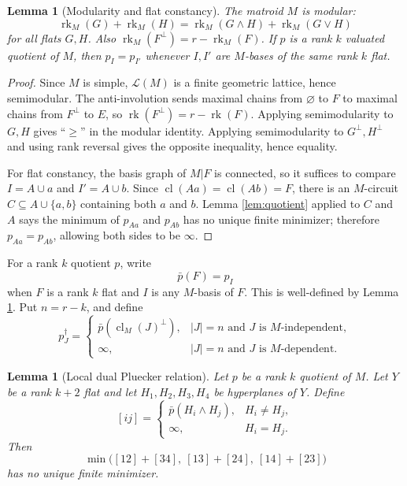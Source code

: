 \documentclass[12pt]{article}
\newtheorem{lemma}[theorem]{Lemma}
\theoremstyle{definition}
\newcommand{\rk}{\operatorname{rk}}
\newcommand{\cl}{\operatorname{cl}}
\newcommand{\cL}{\mathcal L}
\begin{document}
\begin{lemma}[Modularity and flat constancy]\label{lem:modflat}
The matroid \(M\) is modular:
\[
\rk_M(G)+\rk_M(H)=\rk_M(G\wedge H)+\rk_M(G\vee H)
\]
for all flats \(G,H\).  Also \(\rk_M(F^\perp)=r-\rk_M(F)\).  If \(p\) is a rank \(k\) valuated quotient of \(M\), then \(p_I=p_{I'}\) whenever \(I,I'\) are \(M\)-bases of the same rank \(k\) flat.
\end{lemma}

\begin{proof}
Since \(M\) is simple, \(\cL(M)\) is a finite geometric lattice, hence semimodular.  The anti-involution sends maximal chains from \(\varnothing\) to \(F\) to maximal chains from \(F^\perp\) to \(E\), so \(\rk(F^\perp)=r-\rk(F)\).  Applying semimodularity to \(G,H\) gives ``\(\ge\)'' in the modular identity.  Applying semimodularity to \(G^\perp,H^\perp\) and using rank reversal gives the opposite inequality, hence equality.

For flat constancy, the basis graph of \(M|F\) is connected, so it suffices to compare \(I=A\cup a\) and \(I'=A\cup b\).  Since \(\cl(Aa)=\cl(Ab)=F\), there is an \(M\)-circuit \(C\subseteq A\cup\{a,b\}\) containing both \(a\) and \(b\).  Lemma \ref{lem:quotient} applied to \(C\) and \(A\) says the minimum of \(p_{Aa}\) and \(p_{Ab}\) has no unique finite minimizer; therefore \(p_{Aa}=p_{Ab}\), allowing both sides to be \(\infty\).
\end{proof}

For a rank \(k\) quotient \(p\), write
\[
\bar p(F)=p_I
\]
when \(F\) is a rank \(k\) flat and \(I\) is any \(M\)-basis of \(F\).  This is well-defined by Lemma \ref{lem:modflat}.  Put \(n=r-k\), and define
\[
p^\dagger_J=
\begin{cases}
\bar p(\cl_M(J)^\perp),& |J|=n\text{ and }J\text{ is }M\text{-independent},\\
\infty,& |J|=n\text{ and }J\text{ is }M\text{-dependent}.
\end{cases}
\]

\begin{lemma}[Local dual Pluecker relation]\label{lem:local}
Let \(p\) be a rank \(k\) quotient of \(M\).  Let \(Y\) be a rank \(k+2\) flat and let \(H_1,H_2,H_3,H_4\) be hyperplanes of \(Y\).  Define
\[
[ij]=
\begin{cases}
\bar p(H_i\wedge H_j),&H_i\ne H_j,\\
\infty,&H_i=H_j.
\end{cases}
\]
Then
\[
\min\bigl([12]+[34],\ [13]+[24],\ [14]+[23]\bigr)
\]
has no unique finite minimizer.
\end{lemma}
\end{document}
